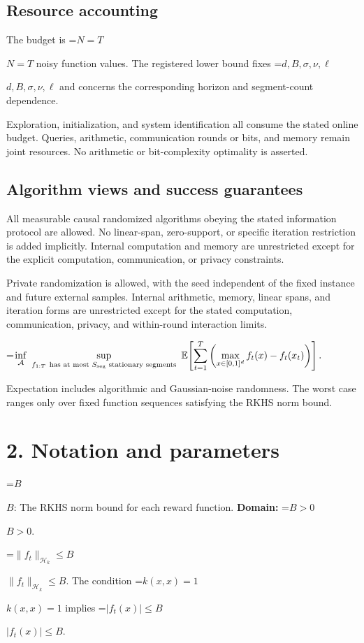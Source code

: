 \documentclass[10pt,a4paper]{article}
\newcommand{\AtlasMath}[1]{\par\begingroup\centering\setbox0=\hbox{$\displaystyle #1$}\ifdim\wd0>1.4\linewidth\typeout{ATLAS WIDE FORMULA: \the\wd0}\fi\ifdim\wd0>\linewidth\resizebox{\linewidth}{!}{\box0}\else\box0\fi\par\endgroup}
\newcommand{\AtlasInlineMath}[1]{\begingroup\setbox0=\hbox{$#1$}\ifdim\wd0>.4\linewidth\endgroup\AtlasMath{#1}\else\endgroup$#1$\fi}
\begin{document}
\subsection{Resource accounting}
The budget is \AtlasInlineMath{N=T} noisy function values. The registered lower bound fixes \AtlasInlineMath{d,B,\sigma,\nu,\ell} and concerns the corresponding horizon and segment-count dependence.

Exploration, initialization, and system identification all consume the stated online budget. Queries, arithmetic, communication rounds or bits, and memory remain joint resources. No arithmetic or bit-complexity optimality is asserted.

\subsection{Algorithm views and success guarantees}
All measurable causal randomized algorithms obeying the stated information protocol are allowed. No linear-span, zero-support, or specific iteration restriction is added implicitly. Internal computation and memory are unrestricted except for the explicit computation, communication, or privacy constraints.

Private randomization is allowed, with the seed independent of the fixed instance and future external samples. Internal arithmetic, memory, linear spans, and iteration forms are unrestricted except for the stated computation, communication, privacy, and within-round interaction limits.


\AtlasMath{\inf_{\mathcal{A}}\ \sup_{f_{1:T}\ \text{\text{has at most} }S_{\mathrm{seg}}\text{ \text{stationary segments}}}\ \mathbb{E}\!\left[\sum_{t=1}^{T}\left(\max_{x\in[0,1]^d}f_t(x)-f_t(x_t)\right)\right].}


Expectation includes algorithmic and Gaussian-noise randomness. The worst case ranges only over fixed function sequences satisfying the RKHS norm bound.

\section{2. Notation and parameters}
\AtlasInlineMath{B}: The RKHS norm bound for each reward function. \textbf{Domain:} \AtlasInlineMath{B>0}.

\AtlasInlineMath{\|f_t\|_{\mathcal H_k}\le B}. The condition \AtlasInlineMath{k(x,x)=1} implies \AtlasInlineMath{|f_t(x)|\le B}.
\end{document}
